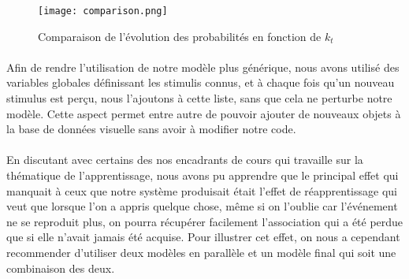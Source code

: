 \begin{figure}[H]
  \caption{Comparaison de l'évolution des probabilités en fonction de $k_t$}
  \texttt{[image: comparison.png]}
\end{figure}

\paragraph{}
Afin de rendre l'utilisation de notre modèle plus générique, nous avons utilisé
des variables globales définissant les stimulis connus, et à chaque fois qu'un
nouveau stimulus est perçu, nous l'ajoutons à cette liste, sans que cela ne
perturbe notre modèle. Cette aspect permet entre autre de pouvoir ajouter de
nouveaux objets à la base de données visuelle sans avoir à modifier notre code.

\paragraph{}
En discutant avec certains des nos encadrants de cours qui travaille sur la
thématique de l'apprentissage, nous avons pu apprendre que le principal effet
qui manquait à ceux que notre système produisait était l'effet de
réapprentissage qui veut que lorsque l'on a appris quelque chose, même si on
l'oublie car l'événement ne se reproduit plus, on pourra récupérer facilement
l'association qui a été perdue que si elle n'avait jamais été acquise. Pour
illustrer cet effet, on nous a cependant recommender d'utiliser deux modèles en
parallèle et un modèle final qui soit une combinaison des deux.
